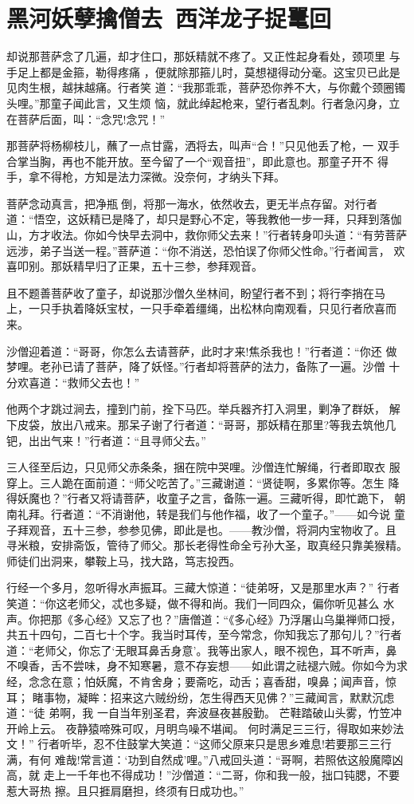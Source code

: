 \chapter{黑河妖孽擒僧去~西洋龙子捉鼍回}

却说那菩萨念了几遍，却才住口，那妖精就不疼了。又正性起身看处，颈项里
与手足上都是金箍，勒得疼痛
，便就除那箍儿时，莫想褪得动分毫。这宝贝已此是见肉生根，越抹越痛。行者笑
道：“我那乖乖，菩萨恐你养不大，与你戴个颈圈镯头哩。”那童子闻此言，又生烦
恼，就此绰起枪来，望行者乱刺。行者急闪身，立在菩萨后面，叫：“念咒!念咒！”

那菩萨将杨柳枝儿，蘸了一点甘露，洒将去，叫声“合！”只见他丢了枪，一
双手合掌当胸，再也不能开放。至今留了一个“观音扭”，即此意也。那童子开不
得手，拿不得枪，方知是法力深微。没奈何，才纳头下拜。

菩萨念动真言，把净瓶倒，将那一海水，依然收去，更无半点存留。对行者
道：“悟空，这妖精已是降了，却只是野心不定，等我教他一步一拜，只拜到落伽
山，方才收法。你如今快早去洞中，救你师父去来！”行者转身叩头道：“有劳菩萨
远涉，弟子当送一程。”菩萨道：“你不消送，恐怕误了你师父性命。”行者闻言，
欢喜叩别。那妖精早归了正果，五十三参，参拜观音。

且不题善菩萨收了童子，却说那沙僧久坐林间，盼望行者不到；将行李捎在马
上，一只手执着降妖宝杖，一只手牵着缰绳，出松林向南观看，只见行者欣喜而来。

沙僧迎着道：“哥哥，你怎么去请菩萨，此时才来!焦杀我也！”行者道：“你还
做梦哩。老孙已请了菩萨，降了妖怪。”行者却将菩萨的法力，备陈了一遍。沙僧
十分欢喜道：“救师父去也！”

他两个才跳过涧去，撞到门前，拴下马匹。举兵器齐打入洞里，剿净了群妖，
解下皮袋，放出八戒来。那呆子谢了行者道：“哥哥，那妖精在那里?等我去筑他几
钯，出出气来！”行者道：“且寻师父去。”

三人径至后边，只见师父赤条条，捆在院中哭哩。沙僧连忙解绳，行者即取衣
服穿上。三人跪在面前道：“师父吃苦了。”三藏谢道：“贤徒啊，多累你等。怎生
降得妖魔也？”行者又将请菩萨，收童子之言，备陈一遍。三藏听得，即忙跪下，
朝南礼拜。行者道：“不消谢他，转是我们与他作福，收了一个童子。”——如今说
童子拜观音，五十三参，参参见佛，即此是也。——教沙僧，将洞内宝物收了。且
寻米粮，安排斋饭，管待了师父。那长老得性命全亏孙大圣，取真经只靠美猴精。
师徒们出洞来，攀鞍上马，找大路，笃志投西。

行经一个多月，忽听得水声振耳。三藏大惊道：“徒弟呀，又是那里水声？”
行者笑道：“你这老师父，忒也多疑，做不得和尚。我们一同四众，偏你听见甚么
水声。你把那《多心经》又忘了也？”唐僧道：“《多心经》乃浮屠山乌巢禅师口授，
共五十四句，二百七十个字。我当时耳传，至今常念，你知我忘了那句儿？”行者
道：“老师父，你忘了‘无眼耳鼻舌身意’。我等出家人，眼不视色，耳不听声，鼻
不嗅香，舌不尝味，身不知寒暑，意不存妄想——如此谓之祛褪六贼。你如今为求
经，念念在意；怕妖魔，不肯舍身；要斋吃，动舌；喜香甜，嗅鼻；闻声音，惊耳；
睹事物，凝眸：招来这六贼纷纷，怎生得西天见佛？”三藏闻言，默默沉虑道：“徒
弟啊，我
一自当年别圣君，奔波昼夜甚殷勤。
芒鞋踏破山头雾，竹笠冲开岭上云。
夜静猿啼殊可叹，月明鸟噪不堪闻。
何时满足三三行，得取如来妙法文！”
行者听毕，忍不住鼓掌大笑道：“这师父原来只是思乡难息!若要那三三行满，有何
难哉!常言道：‘功到自然成’哩。”八戒回头道：“哥啊，若照依这般魔障凶高，就
走上一千年也不得成功！”沙僧道：“二哥，你和我一般，拙口钝腮，不要惹大哥热
擦。且只捱肩磨担，终须有日成功也。”

